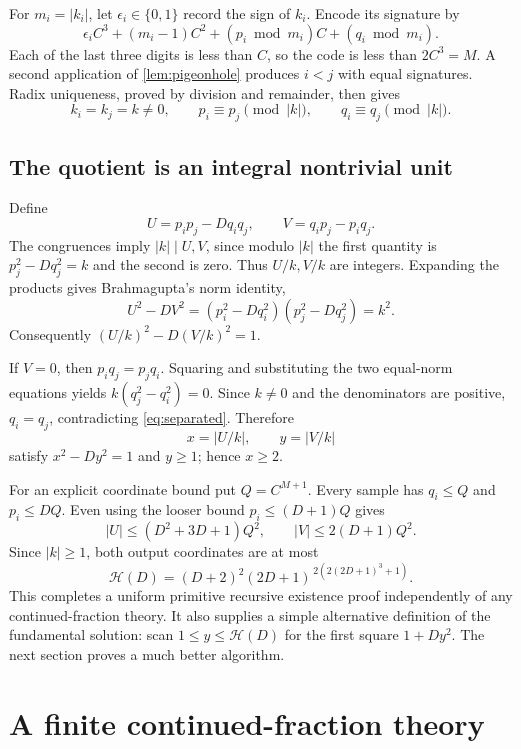 \documentclass[11pt,letterpaper]{article}
\theoremstyle{definition}
\newcommand{\collB}{\mathcal H}
\newcommand{\abs}[1]{\lvert#1\rvert}
\begin{document}
For $m_i=\abs{k_i}$, let $\epsilon_i\in\{0,1\}$ record the sign of $k_i$.
Encode its signature by
\begin{equation}\label{eq:signature}
 \epsilon_iC^3+(m_i-1)C^2
 +(p_i\bmod m_i)C+(q_i\bmod m_i).
\end{equation}
Each of the last three digits is less than $C$, so the code is less than
$2C^3=M$. A second application of \cref{lem:pigeonhole} produces $i<j$
with equal signatures. Radix uniqueness, proved by division and remainder,
then gives
\[
 k_i=k_j=k\ne0,\qquad
 p_i\equiv p_j\pmod{\abs k},\qquad
 q_i\equiv q_j\pmod{\abs k}.
\]

\subsection{The quotient is an integral nontrivial unit}

Define
\[
 U=p_ip_j-Dq_iq_j,\qquad V=q_ip_j-p_iq_j.
\]
The congruences imply $\abs k\mid U,V$, since modulo $\abs k$ the first
quantity is $p_j^2-Dq_j^2=k$ and the second is zero. Thus $U/k,V/k$ are
integers. Expanding the products gives Brahmagupta's norm identity,
\begin{equation}\label{eq:quotientnorm}
 U^2-DV^2=(p_i^2-Dq_i^2)(p_j^2-Dq_j^2)=k^2.
\end{equation}
Consequently $(U/k)^2-D(V/k)^2=1$.

If $V=0$, then $p_iq_j=p_jq_i$. Squaring and substituting the two
equal-norm equations yields $k(q_j^2-q_i^2)=0$. Since $k\ne0$ and the
denominators are positive, $q_i=q_j$, contradicting \eqref{eq:separated}.
Therefore
\[
 x=\abs{U/k},\qquad y=\abs{V/k}
\]
satisfy $x^2-Dy^2=1$ and $y\ge1$; hence $x\ge2$.

For an explicit coordinate bound put $Q=C^{M+1}$. Every sample has
$q_i\le Q$ and $p_i\le DQ$. Even using the looser bound
$p_i\le(D+1)Q$ gives
\[
 \abs U\le(D^2+3D+1)Q^2,
 \qquad \abs V\le2(D+1)Q^2.
\]
Since $\abs k\ge1$, both output coordinates are at most
\begin{equation}\label{eq:H}
 \boxed{\collB(D)=(D+2)^2(2D+1)^{\,2(2(2D+1)^3+1)}.}
\end{equation}
This completes a uniform primitive recursive existence proof independently
of any continued-fraction theory. It also supplies a simple alternative
definition of the fundamental solution: scan $1\le y\le\collB(D)$ for
the first square $1+Dy^2$. The next section proves a much better algorithm.

\section{A finite continued-fraction theory}\label{sec:cf}
\end{document}

